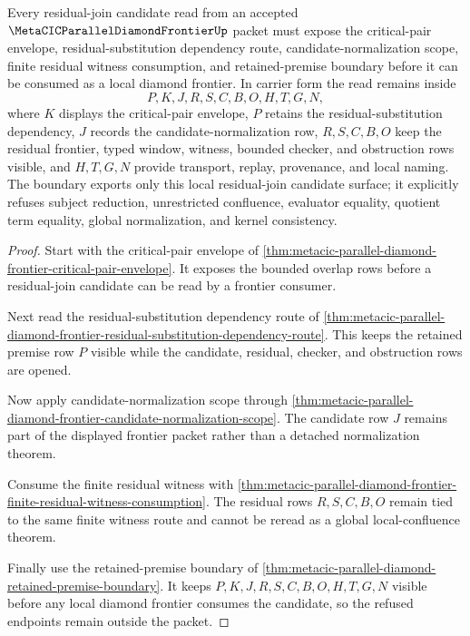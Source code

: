 \begin{theorem}
\label{thm:metacic-parallel-diamond-frontier-residual-join-candidate-dependency-boundary}
Every residual-join candidate read from an accepted $\MetaCICParallelDiamondFrontierUp$ packet must expose the critical-pair envelope, residual-substitution dependency route, candidate-normalization scope, finite residual witness consumption, and retained-premise boundary before it can be consumed as a local diamond frontier. In carrier form the read remains inside
$$
P,K,J,R,S,C,B,O,H,T,G,N ,
$$
where $K$ displays the critical-pair envelope, $P$ retains the residual-substitution dependency, $J$ records the candidate-normalization row, $R,S,C,B,O$ keep the residual frontier, typed window, witness, bounded checker, and obstruction rows visible, and $H,T,G,N$ provide transport, replay, provenance, and local naming. The boundary exports only this local residual-join candidate surface; it explicitly refuses subject reduction, unrestricted confluence, evaluator equality, quotient term equality, global normalization, and kernel consistency.
\end{theorem}
\begin{proof}
Start with the critical-pair envelope of \autoref{thm:metacic-parallel-diamond-frontier-critical-pair-envelope}. It exposes the bounded overlap rows before a residual-join candidate can be read by a frontier consumer.

Next read the residual-substitution dependency route of \autoref{thm:metacic-parallel-diamond-frontier-residual-substitution-dependency-route}. This keeps the retained premise row $P$ visible while the candidate, residual, checker, and obstruction rows are opened.

Now apply candidate-normalization scope through \autoref{thm:metacic-parallel-diamond-frontier-candidate-normalization-scope}. The candidate row $J$ remains part of the displayed frontier packet rather than a detached normalization theorem.

Consume the finite residual witness with \autoref{thm:metacic-parallel-diamond-frontier-finite-residual-witness-consumption}. The residual rows $R,S,C,B,O$ remain tied to the same finite witness route and cannot be reread as a global local-confluence theorem.

Finally use the retained-premise boundary of \autoref{thm:metacic-parallel-diamond-retained-premise-boundary}. It keeps $P,K,J,R,S,C,B,O,H,T,G,N$ visible before any local diamond frontier consumes the candidate, so the refused endpoints remain outside the packet.
\end{proof}
